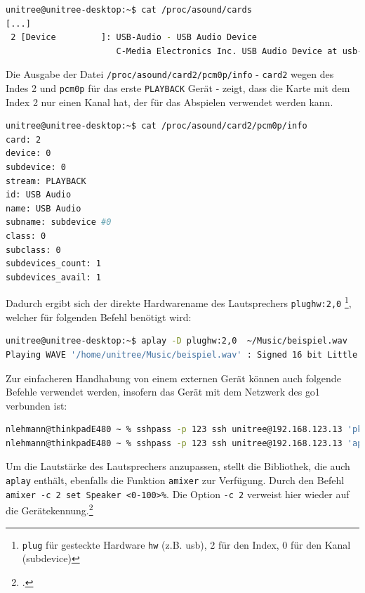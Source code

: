 \begin{lstlisting}[language=Bash]
unitree@unitree-desktop:~$ cat /proc/asound/cards
[...]
 2 [Device         ]: USB-Audio - USB Audio Device
                      C-Media Electronics Inc. USB Audio Device at usb-70090000.xusb-3.4, full speed
\end{lstlisting}

\noindent Die Ausgabe der Datei \texttt{/proc/\allowbreak asound/\allowbreak card2/\allowbreak pcm0p/\allowbreak info} - \texttt{card2} wegen des Indes \num{2} und
\texttt{pcm0p} für das erste \texttt{PLAYBACK} Gerät - zeigt, dass die Karte mit dem Index \num{2} nur einen Kanal hat,
der für das Abspielen verwendet werden kann.

\begin{lstlisting}[language=Bash]
unitree@unitree-desktop:~$ cat /proc/asound/card2/pcm0p/info
card: 2
device: 0
subdevice: 0
stream: PLAYBACK
id: USB Audio
name: USB Audio
subname: subdevice #0
class: 0
subclass: 0
subdevices_count: 1
subdevices_avail: 1
\end{lstlisting}

\noindent Dadurch ergibt sich der direkte Hardwarename des Lautsprechers \texttt{plughw:2,0}
\footnote{\texttt{plug} für gesteckte Hardware \texttt{hw} (z.B. \gls{usb}), \num{2} für den Index, \num{0} für den Kanal (subdevice)},
welcher für folgenden Befehl benötigt wird:

\begin{lstlisting}[language=Bash]
unitree@unitree-desktop:~$ aplay -D plughw:2,0  ~/Music/beispiel.wav
Playing WAVE '/home/unitree/Music/beispiel.wav' : Signed 16 bit Little Endian, Rate 44100 Hz, Stereo
\end{lstlisting}

\noindent Zur einfacheren Handhabung von einem externen Gerät können auch folgende Befehle verwendet werden, insofern das Gerät mit dem Netzwerk
des \gls{go1} verbunden ist:

\begin{lstlisting}[language=Bash]
nlehmann@thinkpadE480 ~ % sshpass -p 123 ssh unitree@192.168.123.13 'pkill -f wsaudio'
nlehmann@thinkpadE480 ~ % sshpass -p 123 ssh unitree@192.168.123.13 'aplay -D plughw:2,0 ~/Music/beispiel.wav'
\end{lstlisting}

\noindent Um die Lautstärke des Lautsprechers anzupassen, stellt die Bibliothek, die auch \texttt{aplay} enthält, ebenfalls die
Funktion \texttt{amixer} zur Verfügung.
Durch den Befehl \texttt{amixer -c 2 set Speaker <0-100>\%}.
Die Option \texttt{-c 2} verweist hier wieder auf die Gerätekennung.\footcite{alsa}
